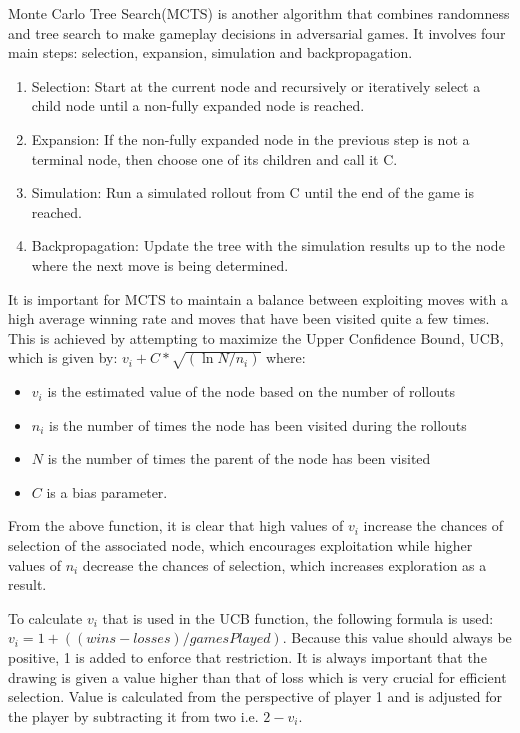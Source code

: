 \documentclass[11pt]{article}
\begin{document}
Monte Carlo Tree Search(MCTS) is another algorithm that combines randomness and tree search to 
make gameplay decisions in adversarial games. It involves four main steps: selection, expansion, 
simulation and backpropagation. 
\begin{enumerate}
    \item Selection: Start at the current node and recursively or iteratively select a child node 
    until a non-fully expanded node is reached.
    \item Expansion: If the non-fully expanded node in the previous step is not
     a terminal node, then choose one of its children and call it C.
    \item Simulation: Run a simulated rollout from C until the end of the game
    is reached.
    \item Backpropagation: Update the tree with the simulation results up to the node where 
    the next move is being determined.
\end{enumerate}
 
It is important for MCTS to maintain a balance between exploiting moves with a high average
winning rate and moves that have been visited quite a few times. This is achieved by attempting
to maximize the Upper Confidence Bound, UCB, which is given by: 
$v_i + C * \sqrt{(\ln{N} / n_i)}$
where:
\begin{itemize} 
    \item $v_i$ is the estimated value of the node based on the number of rollouts
    \item $n_i$ is the number of times the node has been visited during the rollouts
    \item $N$ is the number of times the parent of the node has been visited
    \item $C$ is a bias parameter.
\end{itemize} 

From the above function, it is clear that high values of $v_i$ increase the chances of selection 
of the associated node, which encourages exploitation while higher values of $n_i$ decrease the chances of 
selection, which increases exploration as a result. 

To calculate $v_i$ that is used in the UCB function, the following formula is used: 
$v_i = 1 + ((wins-losses)/gamesPlayed)$. Because this value should always be positive, 1 is added 
to enforce that restriction. It is always important that the drawing is given a value higher than that of loss
which is very crucial for efficient selection. Value is calculated from the perspective of player 1 and is 
adjusted for the player by subtracting it from two i.e. $2-v_i$.
\end{document}
